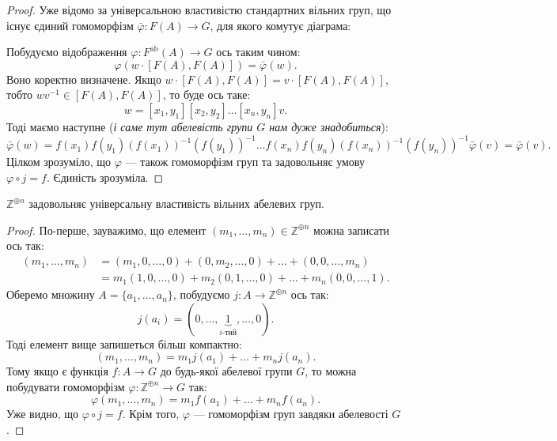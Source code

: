 \documentclass{math_library}
\begin{document}
\begin{proof}
Уже відомо за універсальною властивістю стандартних вільних груп, що існує єдиний гомоморфізм $\bar{\varphi} \colon F(A) \to G$, для якого комутує діаграма:
\begin{figure}[H]
\centering
{}
\end{figure}
Побудуємо відображення $\varphi \colon F^{\text{ab}}(A) \to G$ ось таким чином:
\[
\varphi(w \cdot [F(A),F(A)]) = \bar{\varphi}(w).
\]
Воно коректно визначене. Якщо $w \cdot [F(A),F(A)] = v \cdot [F(A),F(A)]$, тобто $wv^{-1} \in [F(A),F(A)]$, то буде ось таке:
\[
w = [x_1,y_1] [x_2,y_2] \dots [x_n,y_n] v.
\]
Тоді маємо наступне (\textit{і саме тут абелевість групи $G$ нам дуже знадобиться}):
\[
\bar{\varphi}(w) = f(x_1) f(y_1) (f(x_1))^{-1} (f(y_1))^{-1} \dots f(x_n) f(y_n) (f(x_n))^{-1} (f(y_n))^{-1} \bar{\varphi}(v) = \bar{\varphi}(v).
\]
Цілком зрозуміло, що $\varphi$ --- також гомоморфізм груп та задовольняє умову $\varphi \circ j = f$. Єдиність зрозуміла.
\end{proof}

\begin{proposition}
$\mathbb{Z}^{\oplus n}$ задовольняє універсальну властивість вільних абелевих груп.
\end{proposition}

\begin{proof}
По-перше, зауважимо, що елемент $(m_1,\dots,m_n) \in \mathbb{Z}^{\oplus n}$ можна записати ось так:
\begin{align*}
(m_1,\dots,m_n) & = (m_1,0,\dots,0) + (0,m_2,\dots,0) + \dots + (0,0,\dots,m_n) \\
& = m_1 (1,0,\dots,0) + m_2 (0,1,\dots,0) + \dots + m_n (0,0,\dots,1).
\end{align*}
Оберемо множину $A = \{a_1,\dots,a_n\}$, побудуємо $j \colon A \to \mathbb{Z}^{\oplus n}$ ось так: 
\[
j(a_i) = (0,\dots,\underbrace{1}_{i\text{-тий}},\dots,0).
\]
Тоді елемент вище запишеться більш компактно:
\[
(m_1,\dots,m_n) = m_1 j(a_1) + \dots + m_n j(a_n).
\]
Тому якщо є функція $f \colon A \to G$ до будь-якої абелевої групи $G$, то можна побудувати гомоморфізм $\varphi \colon \mathbb{Z}^{\oplus n} \to G$ так:
\[
\varphi(m_1,\dots,m_n) = m_1 f(a_1) + \dots + m_n f(a_n).
\]
Уже видно, що $\varphi \circ j = f$. Крім того, $\varphi$ --- гомоморфізм груп завдяки абелевості $G$.
\end{proof}
\end{document}
